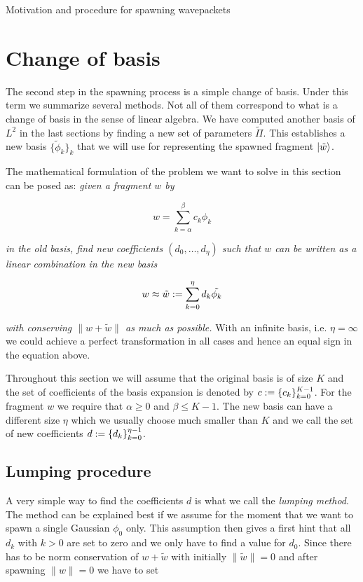 \begin{chapter}{Motivation and procedure for spawning wavepackets}
\section{Change of basis}
\label{sec:change_of_basis}

The second step in the spawning process is a simple change of basis. Under this
term we summarize several methods. Not all of them correspond to what is a change
of basis in the sense of linear algebra. We have computed another basis of $L^2$
in the last sections by finding a new set of parameters $\tilde{\Pi}$. This establishes
a new basis $\{\tilde{\phi}_k\}_k$ that we will use for representing the spawned
fragment $\Ket{\tilde{w}}$. 

The mathematical formulation of the problem we want to solve in this section can
be posed as: \emph{given a fragment $w$ by}

\begin{equation}
  w = \sum_{k=\alpha}^{\beta} c_k \phi_k
\end{equation}

\emph{in the old basis, find new coefficients $\left(d_0, \ldots, d_{\eta}\right)$ such
that $w$ can be written as a linear combination in the new basis}

\begin{equation}
  w \approx \tilde{w} := \sum_{k=0}^{\eta} d_k \tilde{\phi_k}
\end{equation}

\emph{with conserving $\|w + \tilde{w}\|$ as much as possible.} With an
infinite basis, i.e. $\eta=\infty$ we could achieve a perfect transformation in
all cases and hence an equal sign in the equation above.

Throughout this section we will assume that the original basis is of size $K$
and the set of coefficients of the basis expansion is denoted by
$c := \{c_k\}_{k=0}^{K-1}$. For the fragment $w$ we require that $\alpha \geq 0$
and $\beta \leq K-1$. The new basis can have a different size $\eta$ which we usually
choose much smaller than $K$ and we call the set of new coefficients $d := \{d_k\}_{k=0}^{\eta-1}$.


\subsection{Lumping procedure}

A very simple way to find the coefficients $d$ is what we call the \emph{lumping method}.
The method can be explained best if we assume for the moment that we want to spawn
a single Gaussian $\phi_0$ only. This assumption then gives a first hint that all
$d_k$ with $k>0$ are set to zero and we only have to find a value for $d_0$. Since
there has to be norm conservation of $w + \tilde{w}$ with initially $\|\tilde{w}\| = 0$
and after spawning $\|w\| = 0$ we have to set


\end{chapter}
